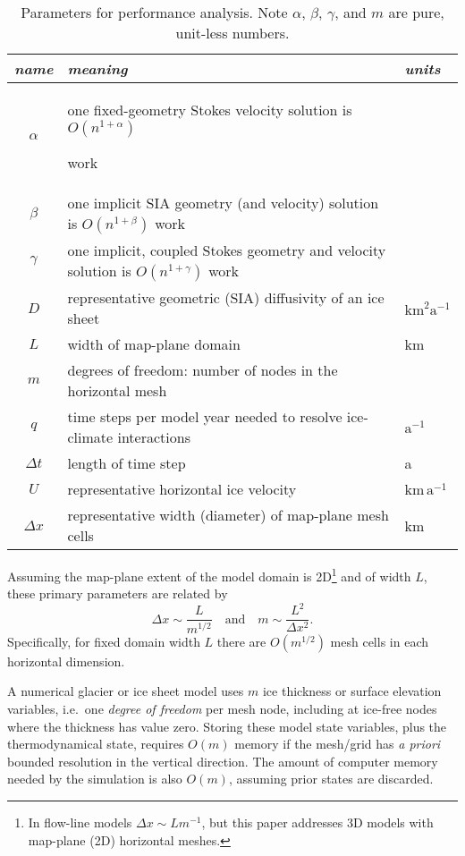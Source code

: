 \documentclass[review]{igs}
\begin{document}
\begin{table*}[ht]
{\normalsize
\begin{tabular}{cll}
\emph{name} & \emph{meaning} & \emph{units} \\ \hline
$\alpha$    & one fixed-geometry Stokes velocity solution is $O(n^{1+\alpha})${\large \strut} work\\
$\beta$     & one implicit SIA geometry (and velocity) solution is $O(n^{1+\beta})$ work \\
$\gamma$    & one implicit, coupled Stokes geometry and velocity solution is $O(n^{1+\gamma})$ work \\
$D$         & representative geometric (SIA) diffusivity of an ice sheet & $\text{km}^2 \text{a}^{-1}$ \\
$L$         & width of map-plane domain & km \\
$m$         & degrees of freedom: number of nodes in the horizontal mesh \\
$q$         & time steps per model year needed to resolve ice-climate interactions & $\text{a}^{-1}$ \\
$\Delta t$  & length of time step & a \\
$U$         & representative horizontal ice velocity & $\text{km}\,\text{a}^{-1}$ \\
$\Delta x$  & representative width (diameter) of map-plane mesh cells & km
\end{tabular}
}
\caption{Parameters for performance analysis.  Note $\alpha$, $\beta$, $\gamma$, and $m$ are pure, unit-less numbers.}
\label{tab:notation}
\end{table*}

Assuming the map-plane extent of the model domain is 2D\footnote{In flow-line models $\Delta x \sim L m^{-1}$, but this paper addresses 3D models with map-plane (2D) horizontal meshes.} and of width $L$, these primary parameters are related by
\begin{equation}
\Delta x \sim \frac{L}{m^{1/2}} \quad \text{and} \quad m \sim \frac{L^2}{\Delta x^2}.  \label{eq:paramrelation}
\end{equation}
Specifically, for fixed domain width $L$ there are $O(m^{1/2})$ mesh cells in each horizontal dimension.

A numerical glacier or ice sheet model uses $m$ ice thickness or surface elevation variables, i.e.~one \emph{degree of freedom} per mesh node, including at ice-free nodes where the thickness has value zero.  Storing these model state variables, plus the thermodynamical state, requires $O(m)$ memory if the mesh/grid has \emph{a priori} bounded resolution in the vertical direction.  The amount of computer memory needed by the simulation is also $O(m)$, assuming prior states are discarded.
\end{document}
